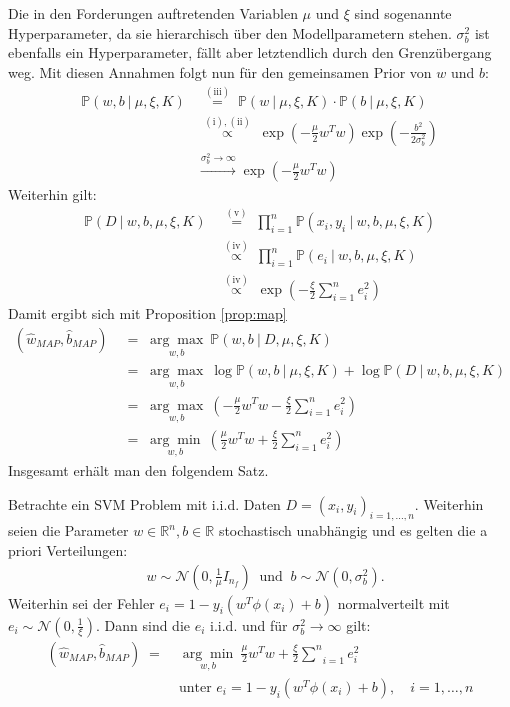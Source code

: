 Die in den Forderungen auftretenden Variablen \(\mu\) und \(\xi\) sind sogenannte Hyperparameter, da sie hierarchisch über den Modellparametern stehen. \(\sigma_b^2\) ist ebenfalls ein Hyperparameter, fällt aber letztendlich durch den Grenzübergang weg. Mit diesen Annahmen folgt nun für den gemeinsamen Prior von \(w\) und \(b\):
\begin{align*}
	\mathbb{P}\left(w,b\:|\:\mu,\xi,K\right)&\;\overset{(\text{iii})}{=}\;\mathbb{P}\left(w\:|\:\mu,\xi,K\right)\cdot\mathbb{P}\left(b\:|\:\mu,\xi,K\right)\\
	&\!\!\:\overset{(\text{i}),(\text{ii})}{\propto}\;\exp\left(-\frac{\mu}{2}w^Tw\right)\exp\left(-\frac{b^2}{2\sigma_b^2}\right)\\
	&\!\overset{\sigma_b^2\rightarrow\infty}{\longrightarrow}\exp\left(-\frac{\mu}{2}w^Tw\right)
\end{align*}
Weiterhin gilt:
\begin{align*}
	\mathbb{P}\left(D\:|\:w,b,\mu,\xi,K\right)&\;\overset{(\text{v})}{=}\;\prod_{i=1}^{n}\mathbb{P}\left(x_i,y_i\:|\:w,b,\mu,\xi,K\right)\\
	&\,\overset{(\text{iv})}{\propto}\:\prod_{i=1}^{n}\mathbb{P}\left(e_i\:|\:w,b,\mu,\xi,K\right)\\
	&\,\overset{(\text{iv})}{\propto}\;\exp\left(-\frac{\xi}{2}\sum_{i=1}^{n}e_i^2\right)
\end{align*}
Damit ergibt sich mit Proposition \autoref{prop:map}
\begin{align*}
	\left(\hat{w}_{MAP},\hat{b}_{MAP}\right)&\;=\;\underset{w,b}{\arg\max}\:\mathbb{P}\left(w,b\:|\:D,\mu,\xi,K\right)\\
	&\;=\;\underset{w,b}{\arg\max}\:\log\mathbb{P}\left(w,b\:|\:\mu,\xi,K\right)+\log\mathbb{P}\left(D\:|\:w,b,\mu,\xi,K\right)\\
	&\;=\;\underset{w,b}{\arg\max}\:\left(-\frac{\mu}{2}w^Tw-\frac{\xi}{2}\sum_{i=1}^{n}e_i^2\right)\\
	&\;=\;\underset{w,b}{\arg\min}\:\left(\frac{\mu}{2}w^Tw+\frac{\xi}{2}\sum_{i=1}^{n}e_i^2\right)
\end{align*}
Insgesamt erhält man den folgendem Satz.
\begin{satz}
	Betrachte ein SVM Problem mit i.i.d. Daten \(D=(x_i,y_i)_{i=1,...,n}\). Weiterhin seien die Parameter \(w\in \mathbb{R}^n, b\in \mathbb{R}\) stochastisch unabhängig und es gelten die a priori Verteilungen:
	\begin{align*}
	&w \sim \mathcal{N}(0,\frac{1}{\mu}I_{n_f})\: \text{ und } \: b \sim \mathcal{N}(0, \sigma_b^2).
	\end{align*}
	Weiterhin sei der Fehler \(e_i =  1 - y_i(w^T \phi(x_i) +b)\) normalverteilt mit \(e_i \sim \mathcal{N}(0,\frac{1}{\xi})\). Dann sind die \(e_i\) i.i.d. und für \(\sigma_b^2 \rightarrow \infty\) gilt:
	\begin{align*}
	\left(\hat{w}_{MAP},\hat{b}_{MAP}\right)  \;=\; &\underset{w,b}{\arg \min}\: \frac{\mu}{2}w^Tw + \frac{\xi}{2}\underset{i=1}{\overset{n}{\sum}}e_i^2\\
	&\text{unter } e_i = 1 - y_i(w^T \phi(x_i) +b),\quad i=1,\dots,n
	\end{align*}
\end{satz}
